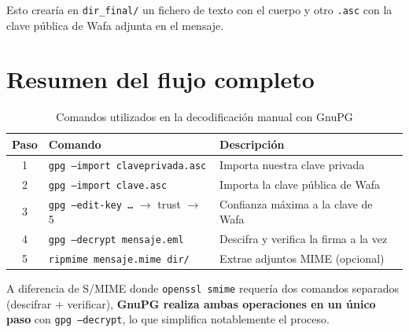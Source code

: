 Esto crearía en \texttt{dir\_final/} un fichero de texto con el cuerpo y otro \texttt{.asc} con la clave pública de Wafa adjunta en el mensaje.

\section{Resumen del flujo completo}

\begin{table}[H]
    \centering
    \caption{Comandos utilizados en la decodificación manual con GnuPG}
    \begin{tabularx}{\textwidth}{c|l|X}
        \toprule
        \textbf{Paso} & \textbf{Comando} & \textbf{Descripción} \\
        \midrule
        1 & \texttt{gpg --import claveprivada.asc} & Importa nuestra clave privada \\
        2 & \texttt{gpg --import clave.asc} & Importa la clave pública de Wafa \\
        3 & \texttt{gpg --edit-key \ldots} $\rightarrow$ trust $\rightarrow$ 5 & Confianza máxima a la clave de Wafa \\
        4 & \texttt{gpg --decrypt mensaje.eml} & Descifra y verifica la firma a la vez \\
        5 & \texttt{ripmime mensaje.mime dir/} & Extrae adjuntos MIME (opcional) \\
        \bottomrule
    \end{tabularx}
\end{table}

A diferencia de S/MIME donde \texttt{openssl smime} requería dos comandos separados (descifrar + verificar), \textbf{GnuPG realiza ambas operaciones en un único paso} con \texttt{gpg --decrypt}, lo que simplifica notablemente el proceso.
